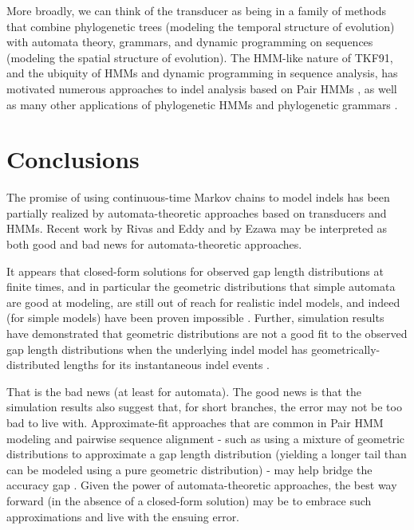 \documentclass{bmcart}
\begin{document}
More broadly, we can think of the transducer as being in a family of methods
that combine phylogenetic trees (modeling the temporal structure of evolution)
with automata theory, grammars, and dynamic programming on sequences (modeling the spatial structure of evolution).
The HMM-like nature of TKF91, and the ubiquity of HMMs and dynamic programming in sequence analysis,
has motivated numerous approaches to indel analysis based on Pair HMMs
\cite{ThorneEtal92,KnudsenMiyamoto2003,WangKeightleyJohnson2006,RivasEddy2008,RivasEddy2015},
as well as many other applications of 
phylogenetic HMMs \cite{GoldmanEtAl96,PedersenHein2003,SiepelHaussler04,SiepelHaussler04b}
and phylogenetic grammars \cite{KnudsenHein99,KnudsenHein2003,PedersenEtAl04,PedersenEtAl2006,KlostermanEtAl2006,pmid22693624}.

\section*{Conclusions}

The promise of using continuous-time Markov chains to model indels
has been partially realized by automata-theoretic approaches
based on transducers and HMMs.
Recent work by Rivas and Eddy \cite{RivasEddy2015}
and by Ezawa \cite{Ezawa2016a,Ezawa2016b,Ezawa2016bErratum}
may be interpreted as both good and bad news for automata-theoretic approaches.

It appears that closed-form solutions for observed gap length distributions at finite times,
and in particular the geometric distributions that simple automata are good at modeling,
are still out of reach for realistic indel models,
and indeed (for simple models) have been proven impossible \cite{RivasEddy2015}.
Further, simulation results have demonstrated that geometric distributions are not
a good fit to the observed gap length distributions when the underlying indel model
has geometrically-distributed lengths for its instantaneous indel events \cite{RivasEddy2015,Ezawa2016a}.

That is the bad news (at least for automata).
The good news is that the simulation results also suggest that,
for short branches, the error may not be too bad to live with.
Approximate-fit approaches that are common in Pair HMM modeling and pairwise sequence alignment - such as using a mixture
of geometric distributions to approximate a gap length distribution (yielding a longer tail than can be modeled
using a pure geometric distribution) - may help bridge the accuracy gap \cite{DoEtAl2005}.
Given the power of automata-theoretic approaches, the best way forward
(in the absence of a closed-form solution) may be to embrace such approximations and live with the ensuing error.
\end{document}
